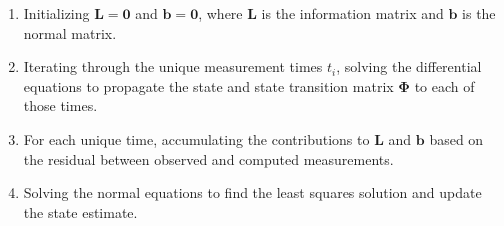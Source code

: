 \documentclass[pdflatex,sn-mathphys-num]{sn-jnl}%
\theoremstyle{thmstyleone}%
\theoremstyle{thmstyletwo}%
\theoremstyle{thmstylethree}%
\renewcommand{\vec}[1]{\boldsymbol{#1}}
\begin{document}
	\begin{enumerate}
		\item Initializing \( {\vec{L} = \vec{0}} \) and \( {\vec{b} = \vec{0}} \), where \( \vec{L} \) is the information matrix and \( \vec{b} \) is the normal matrix.
		\item Iterating through the unique measurement times $t_i$, solving the differential equations to propagate the state and state transition matrix \( \vec{\Phi}\) to each of those times.
		\item For each unique time, accumulating the contributions to \( \vec{L} \) and \( \vec{b} \) based on the residual between observed and computed measurements.
		\item Solving the normal equations to find the least squares solution and update the state estimate.
	\end{enumerate}
	
\end{document}
